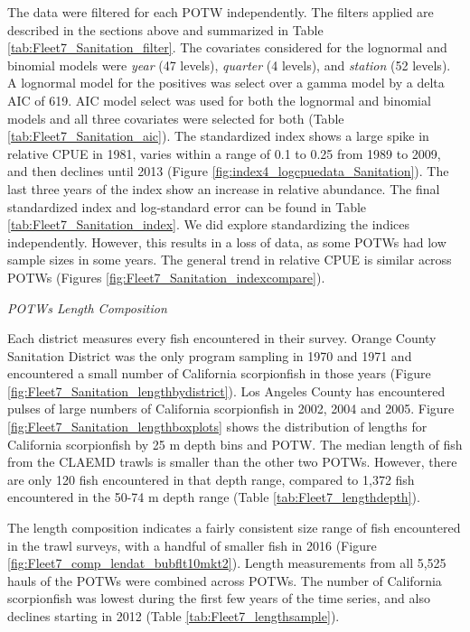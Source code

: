 \documentclass[12pt,]{article}
\begin{document}
The data were filtered for each POTW independently. The filters applied
are described in the sections above and summarized in Table
\ref{tab:Fleet7_Sanitation_filter}. The covariates considered for the
lognormal and binomial models were \emph{year} (47 levels),
\emph{quarter} (4 levels), and \emph{station} (52 levels). A lognormal
model for the positives was select over a gamma model by a delta AIC of
619. AIC model select was used for both the lognormal and binomial
models and all three covariates were selected for both (Table
\ref{tab:Fleet7_Sanitation_aic}). The standardized index shows a large
spike in relative CPUE in 1981, varies within a range of 0.1 to 0.25
from 1989 to 2009, and then declines until 2013 (Figure
\ref{fig:index4_logcpuedata_Sanitation}). The last three years of the
index show an increase in relative abundance. The final standardized
index and log-standard error can be found in Table
\ref{tab:Fleet7_Sanitation_index}. We did explore standardizing the
indices independently. However, this results in a loss of data, as some
POTWs had low sample sizes in some years. The general trend in relative
CPUE is similar across POTWs (Figures
\ref{fig:Fleet7_Sanitation_indexcompare}).

\emph{POTWs Length Composition}

Each district measures every fish encountered in their survey. Orange
County Sanitation District was the only program sampling in 1970 and
1971 and encountered a small number of California scorpionfish in those
years (Figure \ref{fig:Fleet7_Sanitation_lengthbydistrict}). Los Angeles
County has encountered pulses of large numbers of California
scorpionfish in 2002, 2004 and 2005. Figure
\ref{fig:Fleet7_Sanitation_lengthboxplots} shows the distribution of
lengths for California scorpionfish by 25 m depth bins and POTW. The
median length of fish from the CLAEMD trawls is smaller than the other
two POTWs. However, there are only 120 fish encountered in that depth
range, compared to 1,372 fish encountered in the 50-74 m depth range
(Table \ref{tab:Fleet7_lengthdepth}).

The length composition indicates a fairly consistent size range of fish
encountered in the trawl surveys, with a handful of smaller fish in 2016
(Figure \ref{fig:Fleet7_comp_lendat_bubflt10mkt2}). Length measurements
from all 5,525 hauls of the POTWs were combined across POTWs. The number
of California scorpionfish was lowest during the first few years of the
time series, and also declines starting in 2012 (Table
\ref{tab:Fleet7_lengthsample}).
\end{document}
